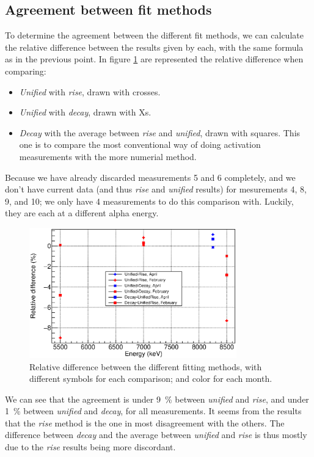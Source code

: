 \documentclass[a4paper,12pt]{report}
\begin{document}
\subsection{Agreement between fit methods}
To determine the agreement between the different fit methods, we can calculate the relative difference between the results given by each, with the same formula as in the previous point.
In figure \ref{activation_method_comparison} are represented the relative difference when comparing:
\begin{itemize}
	\item \textit{Unified} with \textit{rise}, drawn with crosses.
	\item \textit{Unified} with \textit{decay}, drawn with Xs.
	\item \textit{Decay} with the average between \textit{rise} and \textit{unified}, drawn with squares.
		This one is to compare the most conventional way of doing activation measurements with the more numerial method.
\end{itemize}
Because we have already discarded measurements 5 and 6 completely, and we don't have current data (and thus \textit{rise} and \textit{unified} results) for mesurements 4, 8, 9, and 10; we only have 4 measurements to do this comparison with.
Luckily, they are each at a different alpha energy.

\begin{figure}[H]
	\centering
	\includegraphics[width=0.80\textwidth]{activation_method_comparison.eps}
	\caption{Relative difference between the different fitting methods, with different symbols for each comparison; and color for each month.}
	\label{activation_method_comparison}
\end{figure}

We can see that the agreement is under \qty{9}{\percent} between \textit{unified} and \textit{rise}, and under \qty{1}{\percent} between \textit{unified} and \textit{decay}, for all measurements.
It seems from the results that the \textit{rise} method is the one in most disagreement with the others.
The difference between \textit{decay} and the average between \textit{unified} and \textit{rise} is thus mostly due to the \textit{rise} results being more discordant.
\end{document}
